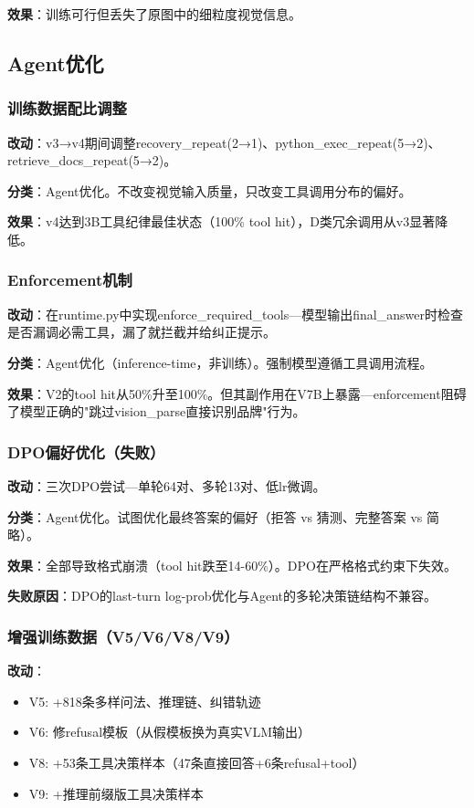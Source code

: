 \documentclass[fontset=none,11pt,a4paper]{ctexart}
\begin{document}
\textbf{效果}：训练可行但丢失了原图中的细粒度视觉信息。

\subsection{Agent优化}

\subsubsection{训练数据配比调整}

\textbf{改动}：v3→v4期间调整recovery\_repeat(2→1)、python\_exec\_repeat(5→2)、retrieve\_docs\_repeat(5→2)。

\textbf{分类}：Agent优化。不改变视觉输入质量，只改变工具调用分布的偏好。

\textbf{效果}：v4达到3B工具纪律最佳状态（100\% tool hit），D类冗余调用从v3显著降低。

\subsubsection{Enforcement机制}

\textbf{改动}：在runtime.py中实现enforce\_required\_tools---模型输出final\_answer时检查是否漏调必需工具，漏了就拦截并给纠正提示。

\textbf{分类}：Agent优化（inference-time，非训练）。强制模型遵循工具调用流程。

\textbf{效果}：V2的tool hit从50\%升至100\%。但其副作用在V7B上暴露---enforcement阻碍了模型正确的"跳过vision\_parse直接识别品牌"行为。

\subsubsection{DPO偏好优化（失败）}

\textbf{改动}：三次DPO尝试---单轮64对、多轮13对、低lr微调。

\textbf{分类}：Agent优化。试图优化最终答案的偏好（拒答 vs 猜测、完整答案 vs 简略）。

\textbf{效果}：全部导致格式崩溃（tool hit跌至14-60\%）。DPO在严格格式约束下失效。

\textbf{失败原因}：DPO的last-turn log-prob优化与Agent的多轮决策链结构不兼容。

\subsubsection{增强训练数据（V5/V6/V8/V9）}

\textbf{改动}：
\begin{itemize}[nosep]
    \item V5: +818条多样问法、推理链、纠错轨迹
    \item V6: 修refusal模板（从假模板换为真实VLM输出）
    \item V8: +53条工具决策样本（47条直接回答+6条refusal+tool）
    \item V9: +推理前缀版工具决策样本
\end{itemize}
\end{document}
